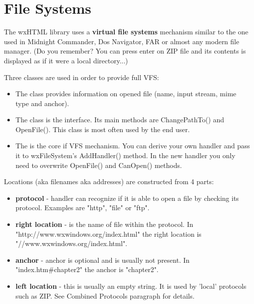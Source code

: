 \section{File Systems}\label{fs}

The wxHTML library uses a {\bf virtual file systems} mechanism
similar to the one used in Midnight Commander, Dos Navigator,
FAR or almost any modern file manager. (Do you remember? You can
press enter on ZIP file and its contents is displayed as if it
were a local directory...)


Three classes are used in order to provide full VFS:

\begin{itemize}
\item The  class provides information
on opened file (name, input stream, mime type and anchor).

\item The  class is the interface.
Its main methods are ChangePathTo() and OpenFile(). This class
is most often used by the end user.

\item The  is the core
if VFS mechanism. You can derive your own handler and pass it to
wxFileSystem's AddHandler() method. In the new handler you only need to
overwrite OpenFile() and CanOpen() methods.
\end{itemize}


Locations (aka filenames aka addresses) are constructed from 4 parts:

\begin{itemize}
\item {\bf protocol} - handler can recognize if it is able to open a
file by checking its protocol. Examples are "http", "file" or "ftp".

\item {\bf right location} - is the name of file within the protocol.
In "http://www.wxwindows.org/index.html" the right location is "//www.wxwindows.org/index.html".

\item {\bf anchor} - anchor is optional and is usually not present.
In "index.htm\#chapter2" the anchor is "chapter2".

\item {\bf left location} - this is usually an empty string. 
It is used by 'local' protocols such as ZIP.
See Combined Protocols paragraph for details.
\end{itemize}

